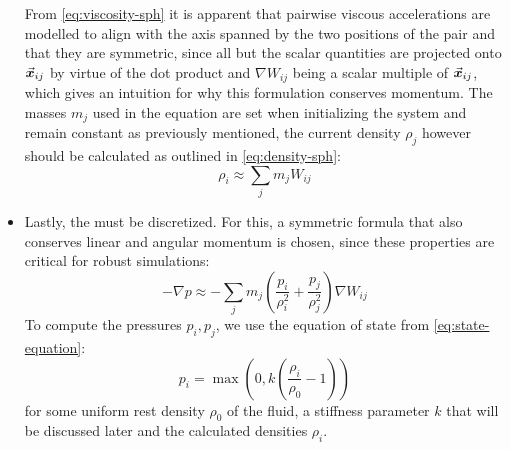 \begin{itemize}
        From \autoref{eq:viscosity-sph} it is apparent that pairwise viscous accelerations are modelled to align with the axis spanned by the two positions of the pair and that they are symmetric, since all but the scalar quantities are projected onto $\vec{\bm{x}}_{ij}$ by virtue of the dot product and $\nabla W_{ij}$ being a scalar multiple of $\vec{\bm{x}}_{ij}$, which gives an intuition for why this formulation conserves momentum\autocite*{tutorial}. The masses $m_j$ used in the equation are set when initializing the system and remain constant as previously mentioned, the current density $\rho_j$ however should be calculated as outlined in \autoref{eq:density-sph}:
        \begin{equation} \rho_i \approx \sum_j m_j W_{ij}\end{equation}
  \item  Lastly, the  must be discretized. For this, a symmetric formula that also conserves linear and angular momentum is chosen, since these properties are critical for robust simulations\autocite*{tutorial}:
        \begin{equation}\label{eq:sph-pressure-acceleration}
          -\nabla p \approx -\sum_j m_j\left(\frac{p_i}{\rho_i^2} + \frac{p_j}{\rho_j^2}\right)\nabla W_{ij}
        \end{equation}
        To compute the pressures $p_i, p_j$, we use the equation of state from \autoref{eq:state-equation}:
        \begin{equation}
          p_i=\max\left(0, k\left(\frac{\rho_i}{\rho_0}-1\right)\right)
        \end{equation}
        for some uniform rest density $\rho_0$ of the fluid, a stiffness parameter $k$ that will be discussed later and the calculated densities $\rho_i$.
\end{itemize}


